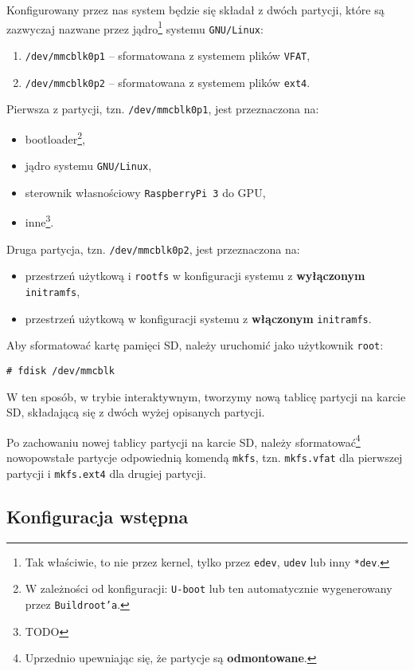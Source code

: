 \documentclass{article}
\begin{document}
Konfigurowany przez nas system będzie się składał z dwóch partycji, które są zazwyczaj nazwane przez jądro\footnote{Tak właściwie, to nie przez kernel, tylko przez \texttt{edev}, \texttt{udev} lub inny \texttt{*dev}.} systemu \texttt{GNU/Linux}:
\begin{enumerate}
	\item \texttt{/dev/mmcblk0p1} -- sformatowana z systemem plików \texttt{VFAT},
	\item \texttt{/dev/mmcblk0p2} -- sformatowana z systemem plików \texttt{ext4}.
\end{enumerate}
Pierwsza z partycji, tzn. \texttt{/dev/mmcblk0p1}, jest przeznaczona na:
\begin{itemize}
	\item bootloader\footnote{W zależności od konfiguracji: \texttt{U-boot} lub ten automatycznie wygenerowany przez \texttt{Buildroot'a}.},
	\item jądro systemu \texttt{GNU/Linux},
	\item sterownik własnościowy \texttt{RaspberryPi~3} do GPU,
	\item inne\footnote{TODO}.
\end{itemize}
Druga partycja, tzn. \texttt{/dev/mmcblk0p2}, jest przeznaczona na:
\begin{itemize}
	\item przestrzeń użytkową i \texttt{rootfs} w konfiguracji systemu z \textbf{wyłączonym} \texttt{initramfs},
	\item przestrzeń użytkową w konfiguracji systemu z \textbf{włączonym} \texttt{initramfs}.
\end{itemize}

Aby sformatować kartę pamięci SD, należy uruchomić jako użytkownik \texttt{root}:
\begin{verbatim}
# fdisk /dev/mmcblk
\end{verbatim}
W ten sposób, w trybie interaktywnym, tworzymy nową tablicę partycji na karcie SD, składającą się z dwóch wyżej opisanych partycji.

Po zachowaniu nowej tablicy partycji na karcie SD, należy sformatować\footnote{Uprzednio upewniając się, że partycje są \textbf{odmontowane}.} nowopowstałe partycje odpowiednią komendą \texttt{mkfs}, tzn. \texttt{mkfs.vfat} dla pierwszej partycji i \texttt{mkfs.ext4} dla drugiej partycji.


\subsection{Konfiguracja wstępna}
\end{document}
